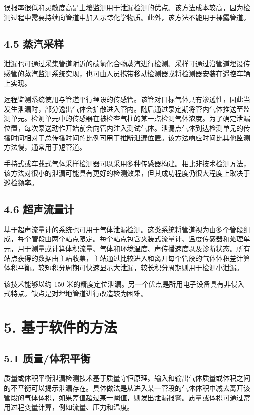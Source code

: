 误报率很低和灵敏度高是土壤监测用于泄漏检测的优点。该方法成本较高，因为检测过程中需要持续向管道中加入示踪化学物质。此外，该方法不能用于裸露管道。

\subsection*{4.5 蒸汽采样}

泄漏也可通过采集管道附近的碳氢化合物蒸汽进行检测。采样可通过沿管道埋设传感管的蒸汽监测系统实现，也可由人员携带移动检测器或将检测器安装在遥控车辆上实现。

远程监测系统使用与管道平行埋设的传感管。该管对目标气体具有渗透性，因此当发生泄漏时，部分逸出气体会扩散进入管内。随后通过泵定期将管内气体推送至监测单元。检测单元中的传感器在被检查气柱的某一点检测气体浓度。为了确定泄漏位置，每次泵送动作开始前会向管内注入测试气体。泄漏点气体到达检测单元的传播时间相对于总传播时间的比例可用于推断泄漏位置。该方法响应时间比其他监测方法慢，通常用于短管道。

手持式或车载式气体采样检测器可以采用多种传感器构建。相比非技术检测方法，该方法对很小的泄漏可能具有更好的检测效果，但其成功程度仍很大程度上取决于巡检频率。

\subsection*{4.6 超声流量计}

基于超声流量计的系统也可用于气体泄漏检测。这类系统将管道视为由多个管段组成，每个管段由两个站点限定。每个站点包含夹装式流量计、温度传感器和处理单元，用于测量或计算体积流量、气体和环境温度、声传播速度以及诊断状态。所有站点获得的数据由主站收集，主站通过比较进入和离开每个管段的气体体积差计算体积平衡。较短积分周期可快速显示大泄漏，较长积分周期则用于检测小泄漏。

该技术能够以约 150 米的精度定位泄漏。另一个优点是所用电子设备具有非侵入式特点。缺点是对埋地管道进行改造较为困难。

\section*{5. 基于软件的方法}

\subsection*{5.1 质量/体积平衡}

质量或体积平衡泄漏检测技术基于质量守恒原理。输入和输出气体质量或体积之间的不平衡可以揭示泄漏存在。具体做法是从进入某一管段的气体体积中减去离开该管段的气体体积，如果差值超过某一阈值，则发出泄漏报警。质量或体积可通过常用过程变量计算，例如流量、压力和温度。

